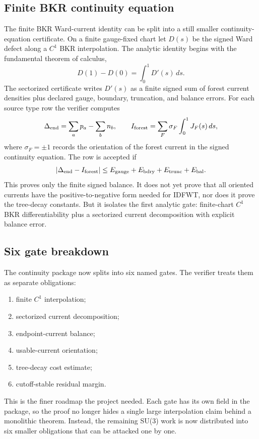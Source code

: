 \subsection{Finite BKR continuity equation}
The finite BKR Ward-current identity can be split into a still smaller
continuity-equation certificate.  On a finite gauge-fixed chart let \(D(s)\)
be the signed Ward defect along a \(C^1\) BKR interpolation.  The analytic
identity begins with the fundamental theorem of calculus,
\[
  D(1)-D(0)=\int_0^1D'(s)\,ds .
\]
The sectorized certificate writes \(D'(s)\) as a finite signed sum of forest
current densities plus declared gauge, boundary, truncation, and balance
errors.  For each source type row the verifier computes
\[
  \Delta_{\rm end}
  =\sum_a p_a-\sum_b n_b,\qquad
  I_{\rm forest}
  =\sum_F \sigma_F\int_0^1J_F(s)\,ds ,
\]
where \(\sigma_F=\pm1\) records the orientation of the forest current in the
signed continuity equation.  The row is accepted if
\[
  |\Delta_{\rm end}-I_{\rm forest}|
  \le
  E_{\rm gauge}+E_{\rm bdry}+E_{\rm trunc}+E_{\rm bal}.
\]
This proves only the finite signed balance.  It does not yet prove that all
oriented currents have the positive-to-negative form needed for IDFWT, nor
does it prove the tree-decay constants.  But it isolates the first analytic
gate: finite-chart \(C^1\) BKR differentiability plus a sectorized current
decomposition with explicit balance error.

\subsection{Six gate breakdown}
The continuity package now splits into six named gates.  The verifier treats
them as separate obligations:
\begin{enumerate}
\item finite \(C^1\) interpolation;
\item sectorized current decomposition;
\item endpoint-current balance;
\item usable-current orientation;
\item tree-decay cost estimate;
\item cutoff-stable residual margin.
\end{enumerate}
This is the finer roadmap the project needed.  Each gate has its own field in
the package, so the proof no longer hides a single large interpolation claim
behind a monolithic theorem.  Instead, the remaining SU(3) work is now
distributed into six smaller obligations that can be attacked one by one.

